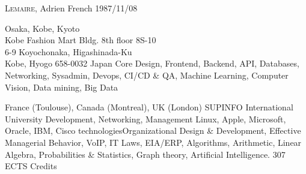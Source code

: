 \documentclass[english]{ecv}
\makeatletter
\renewcommand{\ecvBSec}[2][\ecv@lang]{%
  \ifthenelse{\equal{#1}{\ecv@lang}}{%
    \tabularnewline%
    \ecvLeft{\textsc{\Large{\textcolor{ecv@ColBlue}{#2}}} \medskip } &%
    \tabularnewline%
  }{}%
}
\makeatother
\begin{document}
\begin{ecv}


   {\textsc{Lemaire}, Adrien}
 {}
                {French}
                {1987/11/08}

\ecvBSec{\hypertarget{hypertarget:\ecvProfession}{\ecvProfession}}

 {Osaka, Kobe, Kyoto}
        {\\
                Kobe Fashion Mart Bldg. 8th floor 8S-10\\
                6-9 Koyochonaka, Higashinada-Ku\\
                Kobe, Hyogo 658-0032 Japan}
%
        {Core Design, Frontend, Backend, API, Databases, Networking, Sysadmin,
         Devops, CI/CD \& QA, Machine Learning, Computer Vision, Data mining,
            Big Data
        }

\ecvBSec{\hypertarget{hypertarget:\ecvEducation}{\ecvEducation}}

 {France (Toulouse), Canada (Montreal), UK (London)}
                {}
                {SUPINFO International University}
                {Development, Networking, Management}
                {Linux, Apple, Microsoft, Oracle, IBM, Cisco technologies\ecvNewLine Organizational Design \& Development, Effective Managerial
                Behavior, VoIP, IT Laws, EIA/ERP, Algorithms, Arithmetic, Linear
                Algebra, Probabilities \& Statistics, Graph theory, Artificial
                Intelligence.}
   {307 ECTS Credits}


\end{ecv}
\end{document}
